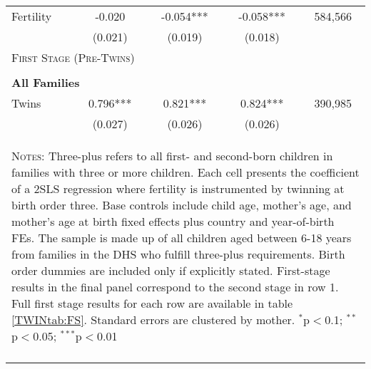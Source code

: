 \begin{table}[!htbp]
\begin{tabular}{lcccc}
Fertility&-0.020&-0.054***&-0.058***&584,566\\
         &(0.021)&(0.019)&(0.018)&\\
\midrule\multicolumn{5}{l}{\textsc{First Stage (Pre-Twins)}}\\ 
&&&&\\
\multicolumn{5}{l}{\textbf{All Families}}\\ 
Twins&0.796***&0.821***&0.824***&390,985\\
         &(0.027)&(0.026)&(0.026)&\\
\hline\multicolumn{5}{p{10cm}}{\begin{footnotesize}\textsc{Notes:} Three-plus refers to all first- and second-born children in families with three or more children.  Each cell presents the coefficient of a 2SLS regression where fertility is instrumented by twinning at birth order three.  Base controls include child age, mother's age, and mother's age at birth fixed effects plus country and year-of-birth FEs.  The sample is made up of all children aged between 6-18 years from families in the DHS who fulfill three-plus requirements. Birth order dummies are included only if explicitly stated.  First-stage results in the final panel correspond to the second stage in row 1.  Full first stage results for each row are available in table \ref{TWINtab:FS}. Standard errors are clustered by mother. 
$^{*}$p$<$0.1; $^{**}$p$<$0.05; $^{***}$p$<$0.01\end{footnotesize}}
\\\bottomrule\normalsize\end{tabular}\end{table} 
